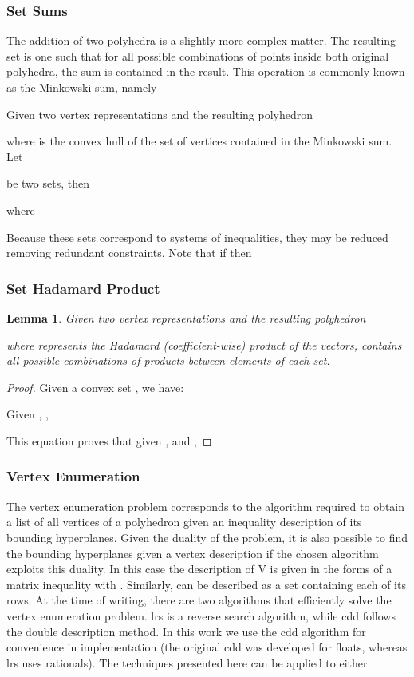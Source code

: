 \documentclass{IEEEtran}
\newtheorem{lemma}{Lemma}
\begin{document}
\subsubsection{Set Sums} \label{sec:convex_sum}
The addition of two polyhedra is a slightly more complex matter. The resulting set is one such that for all possible combinations of points inside both original polyhedra, the sum is contained in the result. This operation is commonly known as the Minkowski sum, namely

Given two vertex representations  and  the resulting polyhedron

where  is the convex hull of the set of vertices contained in the Minkowski sum.\\
Let

be two sets, then

where

Because these sets correspond to systems of inequalities, they may be reduced removing redundant constraints. Note that if  then


\subsubsection{Set Hadamard Product} \label{sec:convex_prod}
\begin{lemma}
Given two vertex representations  and  the resulting polyhedron

where  represents the Hadamard (coefficient-wise) product of the vectors, contains all
possible combinations of products between elements of each set.
\end{lemma}
\begin{proof}
Given a convex set , we have:

Given , , 

This equation proves that given ,  and ,

\end{proof}

\subsubsection{Vertex Enumeration} \label{sec:vertex}


The vertex enumeration problem corresponds to the algorithm required to obtain a list of all vertices of a
polyhedron given an inequality description of its bounding hyperplanes. Given the duality of the problem, it is
also possible to find the bounding hyperplanes given a vertex description if the chosen algorithm exploits this duality.
In this case the description of V is given in the forms of a matrix inequality  with . Similarly,  can be described as a set containing each of its rows. 
At the time of writing, there are two algorithms that efficiently solve the  vertex enumeration problem. lrs is
a reverse search algorithm, while cdd follows the double description method. 
In this work we use the cdd algorithm for convenience in implementation (the original cdd was developed 
for floats, whereas lrs uses rationals). The techniques presented here can be applied to either.
\end{document}
